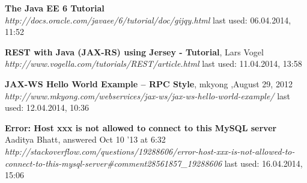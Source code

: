\documentclass[12pt]{article}
\begin{document}
\newpage
\begin{thebibliography}{56}

   \textbf{The Java EE 6 Tutorial} \\
  \textit{http://docs.oracle.com/javaee/6/tutorial/doc/gijqy.html}
  \newline last used: 06.04.2014, 11:52
  
   \textbf{REST with Java (JAX-RS) using Jersey - Tutorial}, Lars Vogel\\
  \textit{  http://www.vogella.com/tutorials/REST/article.html}
  \newline last used: 11.04.2014, 13:58
  
    
   \textbf{JAX-WS Hello World Example – RPC Style}, mkyong ,August 29, 2012\\
  \textit{  http://www.mkyong.com/webservices/jax-ws/jax-ws-hello-world-example/}
  \newline last used: 12.04.2014, 10:36
  
   \textbf{Error: Host xxx is not allowed to connect to this MySQL server}\\ Aaditya Bhatt, answered Oct 10 '13 at 6:32\\
  \textit{   http://stackoverflow.com/questions/19288606/error-host-xxx-is-not-allowed-to-connect-to-this-mysql-server\#comment28561857\_19288606
}
  \newline last used: 16.04.2014, 15:06
  

\end{thebibliography}
\end{document}
